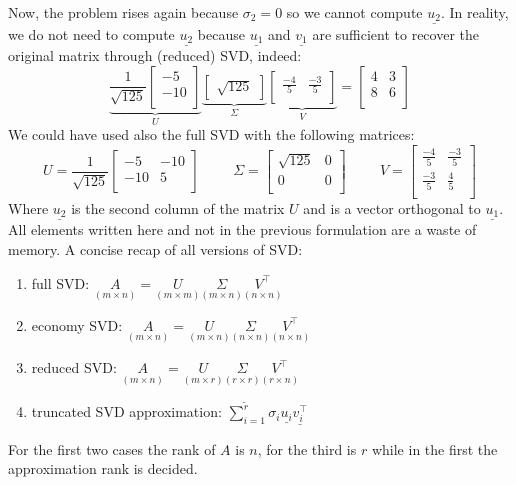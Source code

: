 Now, the problem rises again because $\sigma_2 = 0$ so we cannot compute $\underline{u_2}$. In reality, we do not need to compute $\underline{u_2}$ because $\underline{u_1}$ and $\underline{v_1}$ are sufficient to recover the original matrix through (reduced) SVD, indeed:
\[
\underbrace{
\dfrac{1}{\sqrt{125}} \begin{bmatrix}
    -5 \\
    -10\\
\end{bmatrix}}_{U}
\underbrace{
\begin{bmatrix}
    \sqrt{125}
\end{bmatrix}}_{\Sigma}
\underbrace{ 
\begin{bmatrix}
    \frac{-4}{5} & \frac{-3}{5}\\
\end{bmatrix}}_{V}   
=
\begin{bmatrix}
    4 & 3\\
    8 & 6\\
\end{bmatrix}
\] 
We could have used also the full SVD with the following matrices:
\[
    U = \dfrac{1}{\sqrt{125}} \begin{bmatrix}
        -5 & -10\\
        -10 & 5\\
    \end{bmatrix}
\hspace{1cm}
\Sigma = \begin{bmatrix}
    \sqrt{125} & 0\\
    0 & 0\\
\end{bmatrix}
\hspace{1cm}
V = \begin{bmatrix}
    \frac{-4}{5} & \frac{-3}{5}\\
    \frac{-3}{5} & \frac{4}{5}\\
\end{bmatrix}
\]
Where $\underline{u_2}$ is the second column of the matrix $U$ and is a vector orthogonal to $\underline{u_1}$. All elements written here and not in the previous formulation are a waste of memory.
A concise recap of all versions of SVD:
\begin{enumerate}
    \item full SVD: $\underset{(m \times n)}{A} = \underset{(m \times m)}{U}\underset{(m \times n)}{\Sigma}\underset{(n \times n)}{V^\intercal}$
    \item economy SVD: $\underset{(m \times n)}{A} = \underset {(m \times n)}{U}\underset{(n \times n)}{\Sigma}\underset{(n \times n)}{V^\intercal}$
    \item reduced SVD: $\underset{(m \times n)}{A} = \underset{(m \times r)}{U}\underset{(r \times r)}{\Sigma}\underset{(r \times n)}{V^\intercal}$
    \item truncated SVD approximation: $\sum\limits_{i=1}^{\tilde{r}} \sigma_i\underline{u_i}\underline{v_i^\intercal}$
\end{enumerate}
For the first two cases the rank of $A$ is $n$, for the third is $r$ while in the first the approximation rank is decided.

